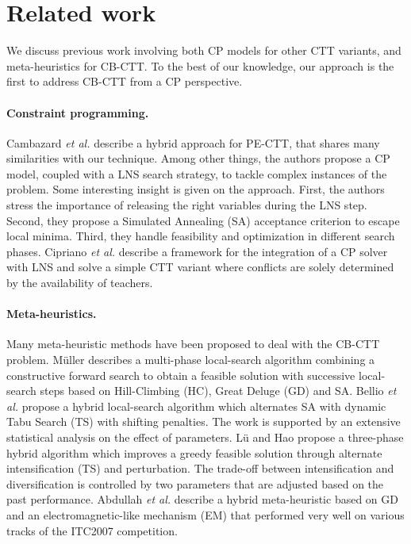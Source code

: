 \documentclass{llncs}
\begin{document}
\vspace{-1.3cm}
\section{Related work}\label{sec:related_work}
\vspace{-0.1cm}
We discuss previous work involving both CP models for other CTT variants, and meta-heuristics for CB-CTT. To the best of our knowledge, our approach is the first to address CB-CTT from a CP perspective.
%
\vspace{-0.05cm}
\paragraph{Constraint programming.} Cambazard \emph{et al.} \cite{CHOP08} describe a hybrid approach for PE-CTT, that shares many similarities with our technique. Among other things, the authors propose a CP model, coupled with a LNS search strategy, to tackle complex instances of the problem. 
Some interesting insight is given on the approach. First, the authors stress the importance of releasing the right variables during the LNS step. Second, they propose a Simulated Annealing (SA) acceptance criterion to escape local minima. Third, they handle feasibility and optimization in different search phases.
Cipriano \emph{et al.} \cite{CiDD12} describe a framework for the integration of a CP solver with LNS and solve a simple CTT variant where conflicts are solely determined by the availability of teachers.  
%
\vspace{-0.05cm}
\paragraph{Meta-heuristics.} Many meta-heuristic methods have been proposed to deal with the CB-CTT problem. 
M\"uller \cite{Mull09} describes a multi-phase local-search algorithm combining a constructive forward search to obtain a feasible solution with successive local-search steps based on Hill-Climbing (HC), Great Deluge (GD) and SA. Bellio \emph{et al.} \cite{BeDS12} propose a hybrid local-search algorithm which alternates SA with dynamic Tabu Search (TS) with shifting penalties. The work is supported by an extensive statistical analysis on the effect of parameters. L\"u and Hao \cite{LuHa09} propose a three-phase hybrid algorithm which improves a greedy feasible solution through alternate intensification (TS) and perturbation. The trade-off between intensification and diversification is controlled by two parameters that are adjusted based on the past performance. Abdullah \emph{et al.} \cite{ATMM10} describe a hybrid meta-heuristic based on GD and an electromagnetic-like mechanism (EM) that performed very well on various tracks of the ITC2007 competition.
\end{document}
